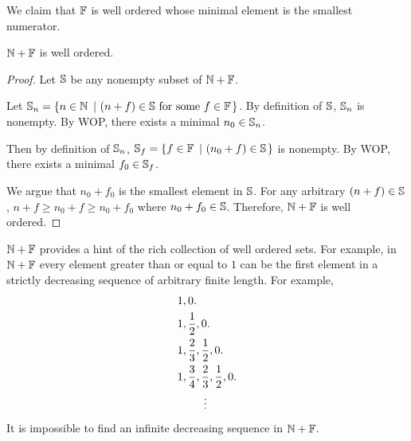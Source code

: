 We claim that $\mathbb{F}$ is well ordered whose minimal element is the smallest
numerator.

\begin{lemNotes}
    $\mathbb{N} + \mathbb{F}$ is well ordered.
\end{lemNotes}

\begin{proof}
    Let $\mathbb{S}$ be any nonempty subset of $\mathbb{N} + \mathbb{F}$.

    Let $\ms{S}_n = \left\{n \in \ms{N} \ \left| \  (n + f) \in \ms{S} \ \text{for some} \ f \in \ms{F} \right. \right\}$.
    By definition of $\mathbb{S}$, $\mathbb{S}_n$ is nonempty. By WOP, there exists a minimal $n_0 \in \mathbb{S}_n$.

    Then by definition of $\mathbb{S}_n$, $\mathbb{S}_f = \left\{f \in \mathbb{F} \ \left| \  (n_0 + f) \in \mathbb{S} \right. \right\}$ is nonempty.
    By WOP, there exists a minimal $f_0 \in \mathbb{S}_f$.

    We argue that $n_0 + f_0$ is the smallest element in $\mathbb{S}$.
    For any arbitrary $(n + f) \in \mathbb{S}$, $n + f \geq n_0 + f \geq n_0 + f_0$
    where $n_0 + f_0 \in \mathbb{S}$. Therefore, $\mathbb{N} + \mathbb{F}$ is well ordered.
\end{proof}

\begin{ab}
    $\mathbb{N} + \mathbb{F}$ provides a hint of the rich collection of well ordered sets.
    For example, in $\mathbb{N} + \mathbb{F}$ every element greater than or equal to $1$
    can be the first element in a strictly decreasing sequence of arbitrary finite length. For example,
    \begin{align*}
        & 1,0. \\
        & 1,\dfrac{1}{2},0. \\
        & 1,\dfrac{2}{3},\dfrac{1}{2},0. \\
        & 1,\dfrac{3}{4},\dfrac{2}{3},\dfrac{1}{2},0. \\
        & \vdotswithin{\mspace{90mu}}
    \end{align*}
    It is impossible to find an infinite decreasing sequence in $\mathbb{N} + \mathbb{F}$.
\end{ab}
